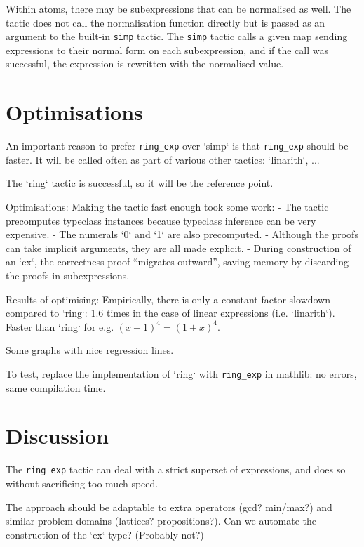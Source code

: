 \documentclass{llncs}
\newcommand{\lean}[1]{\texttt{#1}\xspace} %
\newcommand{\ringexp}{\lean{ring\_exp}}
\begin{document}
Within atoms, there may be subexpressions that can be normalised as well.
The tactic does not call the normalisation function directly
but is passed as an argument to the built-in \lean{simp} tactic.
The \lean{simp} tactic calls a given map sending expressions to their normal form on each subexpression,
and if the call was successful, the expression is rewritten with the normalised value.

\section{Optimisations}

An important reason to prefer \ringexp over `simp` is that \ringexp should be faster.
It will be called often as part of various other tactics: `linarith`, ...

The `ring` tactic is successful, so it will be the reference point.

Optimisations:
Making the tactic fast enough took some work:
- The tactic precomputes typeclass instances because typeclass inference can be very expensive.
- The numerals `0` and `1` are also precomputed.
- Although the proofs can take implicit arguments, they are all made explicit.
- During construction of an `ex`, the correctness proof ``migrates outward'', saving memory by discarding the proofs in subexpressions.

Results of optimising:
Empirically, there is only a constant factor slowdown compared to `ring`:
1.6 times in the case of linear expressions (i.e. `linarith`).
Faster than `ring` for e.g. $(x + 1)^4 = (1 + x)^4$.

Some graphs with nice regression lines.

To test, replace the implementation of `ring` with \ringexp in mathlib: no errors, same compilation time.

\section{Discussion}

The \ringexp tactic can deal with a strict superset of expressions,
and does so without sacrificing too much speed.

The approach should be adaptable to extra operators (gcd? min/max?) and similar problem domains (lattices? propositions?).
Can we automate the construction of the `ex` type? (Probably not?)
\end{document}
